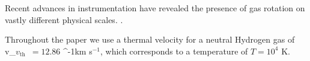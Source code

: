 \documentclass[a4paper,fleqn,usenatbib]{mnras}
\newcommand{\lya}{\ifmmode{{\rm Ly}\alpha}\else Ly$\alpha$\ \fi}
\newcommand{\kms}{\ifmmode\mathrm{km\ s}^{-1}\else km s$^{-1}$\fi}
\newcommand{\vrot}{\ifmmode v_{\mathrm{rot}}\else $v_{\mathrm{rot}}$~\fi}
\newcommand{\vout}{\ifmmode v_{\mathrm{out}}\else $v_{\mathrm{out}}$~\fi}
\newcommand{\tauh}{\ifmmode \tau_{\mathrm{H}}\else $\tau_{\mathrm{H}}$~\fi}
\newcommand{\vth}{\ifmmode v_{\mathrm{th}}\else $v_{\mathrm{th}}$~\fi}
\begin{document}
Recent advances in instrumentation have revealed the presence of gas
rotation on vastly different physical scales.
\citep[e.g.][]{Herenz2016}.  




Throughout the paper we use a thermal velocity for a neutral Hydrogen
gas of \vth $= 12.86$ \kms, which corresponds to a temperature of
$T=10^4$ K. 


\end{document}
